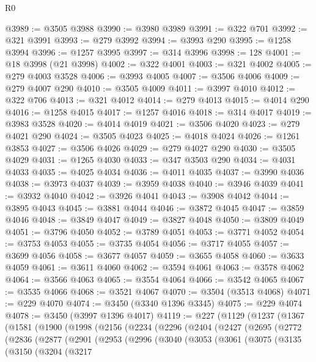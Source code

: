 \begin{lexlean}{R0}
\begin{coremodule}
@3989 := @3505 @3988
@3990 := @3980 @3989
@3991 := @322 @701
@3992 := @321 @3991
@3993 := @279 @3992
@3994 := @3993 @290
@3995 := @1258 @3994
@3996 := @1257 @3995
@3997 := @314 @3996
@3998 := 128
@4001 := @18 @3998 (@21 @3998)
@4002 := @322 @4001
@4003 := @321 @4002
@4005 := @279 @4003 @3528
@4006 := @3993 @4005
@4007 := @3506 @4006
@4009 := @279 @4007 @290
@4010 := @3505 @4009
@4011 := @3997 @4010
@4012 := @322 @706
@4013 := @321 @4012
@4014 := @279 @4013
@4015 := @4014 @290
@4016 := @1258 @4015
@4017 := @1257 @4016
@4018 := @314 @4017
@4019 := @3983 @3528
@4020 := @4014 @4019
@4021 := @3506 @4020
@4023 := @279 @4021 @290
@4024 := @3505 @4023
@4025 := @4018 @4024
@4026 := @1261 @3853
@4027 := @3506 @4026
@4029 := @279 @4027 @290
@4030 := @3505 @4029
@4031 := @1265 @4030
@4033 := @347 @3503 @290
@4034 := @4031 @4033
@4035 := @4025 @4034
@4036 := @4011 @4035
@4037 := @3990 @4036
@4038 := @3973 @4037
@4039 := @3959 @4038
@4040 := @3946 @4039
@4041 := @3932 @4040
@4042 := @3926 @4041
@4043 := @3908 @4042
@4044 := @3895 @4043
@4045 := @3881 @4044
@4046 := @3872 @4045
@4047 := @3859 @4046
@4048 := @3849 @4047
@4049 := @3827 @4048
@4050 := @3809 @4049
@4051 := @3796 @4050
@4052 := @3789 @4051
@4053 := @3771 @4052
@4054 := @3753 @4053
@4055 := @3735 @4054
@4056 := @3717 @4055
@4057 := @3699 @4056
@4058 := @3677 @4057
@4059 := @3655 @4058
@4060 := @3633 @4059
@4061 := @3611 @4060
@4062 := @3594 @4061
@4063 := @3578 @4062
@4064 := @3566 @4063
@4065 := @3554 @4064
@4066 := @3542 @4065
@4067 := @3535 @4066
@4068 := @3521 @4067
@4070 := @3504 (@3513 @4068)
@4071 := @229 @4070
@4074 := @3450 (@3340 @1396 @3345)
@4075 := @229 @4074
@4078 := @3450 (@3997 @1396 @4017)
@4119 := @227
    (@1129
      (@1237
        (@1367
          (@1581
            (@1900
              (@1998
                (@2156
                  (@2234
                    (@2296
                      (@2404
                        (@2427
                          (@2695
                            (@2772
                              (@2836
                                (@2877
                                  (@2901
                                    (@2953
                                      (@2996
                                        (@3040
                                          (@3053
                                            (@3061
                                              (@3075
                                                (@3135
                                                  (@3150
                                                    (@3204
                                                      (@3217

\end{coremodule}
\end{lexlean}
